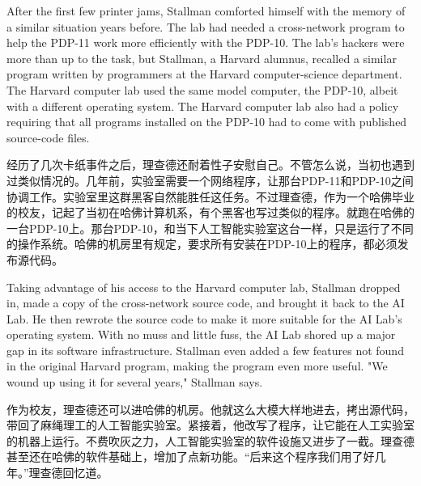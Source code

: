 \ifdefined\eng
After the first few printer jams, Stallman comforted himself with the memory of a similar situation years before. The lab had needed a cross-network program to help the PDP-11 work more efficiently with the PDP-10. The lab's hackers were more than up to the task, but Stallman, a Harvard alumnus, recalled a similar program written by programmers at the Harvard computer-science department. The Harvard computer lab used the same model computer, the PDP-10, albeit with a different operating system. The Harvard computer lab also had a policy requiring that all programs installed on the PDP-10 had to come with published source-code files.
\fi

\ifdefined\chs
经历了几次卡纸事件之后，理查德还耐着性子安慰自己。不管怎么说，当初也遇到过类似情况的。几年前，实验室需要一个网络程序，让那台PDP-11和PDP-10之间协调工作。实验室里这群黑客自然能胜任这任务。不过理查德，作为一个哈佛毕业的校友，记起了当初在哈佛计算机系，有个黑客也写过类似的程序。就跑在哈佛的一台PDP-10上。那台PDP-10，和当下人工智能实验室这台一样，只是运行了不同的操作系统。哈佛的机房里有规定，要求所有安装在PDP-10上的程序，都必须发布源代码。
\fi

\ifdefined\eng
Taking advantage of his access to the Harvard computer lab, Stallman dropped in, made a copy of the cross-network source code, and brought it back to the AI Lab. He then rewrote the source code to make it more suitable for the AI Lab's operating system. With no muss and little fuss, the AI Lab shored up a major gap in its software infrastructure. Stallman even added a few features not found in the original Harvard program, making the program even more useful. "We wound up using it for several years," Stallman says.
\fi

\ifdefined\chs
作为校友，理查德还可以进哈佛的机房。他就这么大模大样地进去，拷出源代码，带回了麻绳理工的人工智能实验室。紧接着，他改写了程序，让它能在人工实验室的机器上运行。不费吹灰之力，人工智能实验室的软件设施又进步了一截。理查德甚至还在哈佛的软件基础上，增加了点新功能。“后来这个程序我们用了好几年。”理查德回忆道。
\fi




